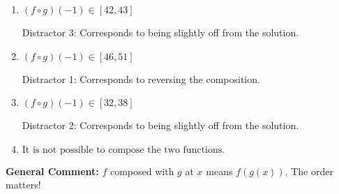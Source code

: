 \documentclass{extbook}[14pt]
\begin{document}
\begin{enumerate}
{\begin{enumerate}[label=\Alph*.]
* This is the correct solution
\item \( (f \circ g)(-1) \in [42, 43] \)

 Distractor 3: Corresponds to being slightly off from the solution.
\item \( (f \circ g)(-1) \in [46, 51] \)

 Distractor 1: Corresponds to reversing the composition.
\item \( (f \circ g)(-1) \in [32, 38] \)

 Distractor 2: Corresponds to being slightly off from the solution.
\item \( \text{It is not possible to compose the two functions.} \)


\end{enumerate}

\textbf{General Comment:} $f$ composed with $g$ at $x$ means $f(g(x))$. The order matters!
}
\end{enumerate}
\end{document}
